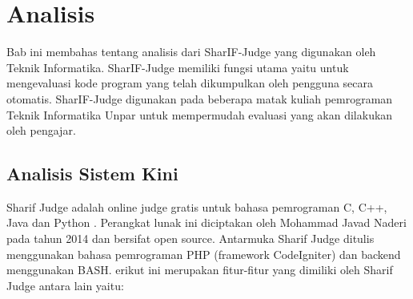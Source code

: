 \chapter{Analisis}
\label{chap:analisis}
Bab ini membahas tentang analisis dari SharIF-Judge yang digunakan oleh Teknik Informatika. SharIF-Judge memiliki fungsi utama yaitu untuk mengevaluasi kode program yang telah dikumpulkan oleh pengguna secara otomatis. SharIF-Judge digunakan pada beberapa matak kuliah pemrograman Teknik Informatika Unpar untuk mempermudah evaluasi yang akan dilakukan oleh pengajar.

\section{Analisis Sistem Kini}
\label{sec: Analisis Sistem Kini}
Sharif Judge adalah online judge gratis untuk bahasa pemrograman C, C++, Java dan Python \cite{sharif_judge}. Perangkat lunak ini diciptakan oleh Mohammad Javad Naderi pada tahun 2014 dan bersifat open source. Antarmuka Sharif Judge ditulis menggunakan bahasa pemrograman PHP (framework CodeIgniter) dan backend menggunakan BASH.
erikut ini merupakan fitur-fitur yang dimiliki oleh Sharif Judge antara lain yaitu:
